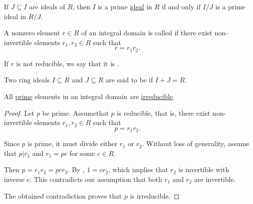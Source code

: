 \begin{proposition}\label{thm:prime_ideal_iff_prime_quotient_ideal}
  If \( J \subseteq I \) are ideals of \( R \), then \( I \) is a prime \hyperref[def:prime_ring_ideal]{ideal} in \( R \) if and only if \( I / J \) is a prime ideal in  \( R / J \).
\end{proposition}

\begin{definition}\label{def:irreducible_ring_element}
  A nonzero element \( r \in R \) of an integral domain is called  if there exist non-invertible elements \( r_1, r_2 \in R \) such that
  \begin{equation*}
    r = r_1 r_2.
  \end{equation*}

  If \( r \) is not reducible, we say that it is .
\end{definition}

\begin{definition}\label{def:coprime_ring_ideals}
  Two ring ideals \( I \subseteq R \) and \( J \subseteq R \) are said to be  if \( I + J = R \).
\end{definition}

\begin{proposition}\label{thm:prime_implies_irreducible}\cite[389]{Knapp2016BAlg}
  All \hyperref[def:prime_ring_ideal]{prime} elements in an integral domain are \hyperref[def:irreducible_ring_element]{irreducible}.
\end{proposition}
\begin{proof}
  Let \( p \) be prime. Assume\LEM that \( p \) is reducible, that is, there exist non-invertible elements \( r_1, r_2 \in R \) such that
  \begin{equation*}
    p = r_1 r_2.
  \end{equation*}

  Since \( p \) is prime, it must divide either \( r_1 \) or \( r_2 \). Without loss of generality, assume that \( p | r_1 \) and \( r_1 = pc \) for some \( c \in R \).

  Then \( p = r_1 r_2 = pc r_2 \). By , \( 1 = c r_2 \), which implies that \( r_2 \) is invertible with inverse \( c \). This contradicts our assumption that both \( r_1 \) and \( r_2 \) are invertible.

  The obtained contradiction proves that \( p \) is irreducible.
\end{proof}

